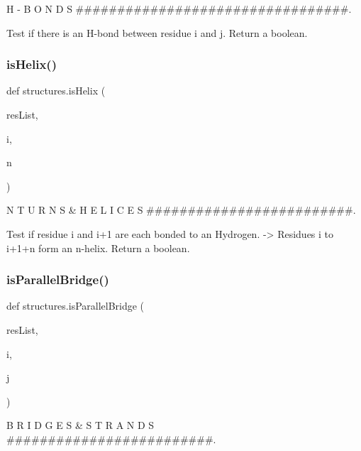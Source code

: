 H -\/ B O N D S \#\#\#\#\#\#\#\#\#\#\#\#\#\#\#\#\#\#\#\#\#\#\#\#\#\#\#\#\#\#\#\#\#. 

\begin{DoxyVerb}Test if there is an H-bond between residue i and j. Return a boolean.\end{DoxyVerb}
 \mbox{\label{namespacestructures_a6e7168d4ee2a843f6c542b9a2be62de8}} 
\subsubsection{\texorpdfstring{is\+Helix()}{isHelix()}}
{\footnotesize\ttfamily def structures.\+is\+Helix (\begin{DoxyParamCaption}\item[{}]{res\+List,  }\item[{}]{i,  }\item[{}]{n }\end{DoxyParamCaption})}



N T U R N S \& H E L I C E S \#\#\#\#\#\#\#\#\#\#\#\#\#\#\#\#\#\#\#\#\#\#\#\#\#. 

\begin{DoxyVerb}Test if residue i and i+1 are each bonded to an Hydrogen.
-> Residues i to i+1+n form an n-helix. Return a boolean.\end{DoxyVerb}
 \mbox{\label{namespacestructures_ab64fc35a044e3333a6250842d5556a76}} 
\subsubsection{\texorpdfstring{is\+Parallel\+Bridge()}{isParallelBridge()}}
{\footnotesize\ttfamily def structures.\+is\+Parallel\+Bridge (\begin{DoxyParamCaption}\item[{}]{res\+List,  }\item[{}]{i,  }\item[{}]{j }\end{DoxyParamCaption})}



B R I D G E S \& S T R A N D S \#\#\#\#\#\#\#\#\#\#\#\#\#\#\#\#\#\#\#\#\#\#\#\#\#. 

